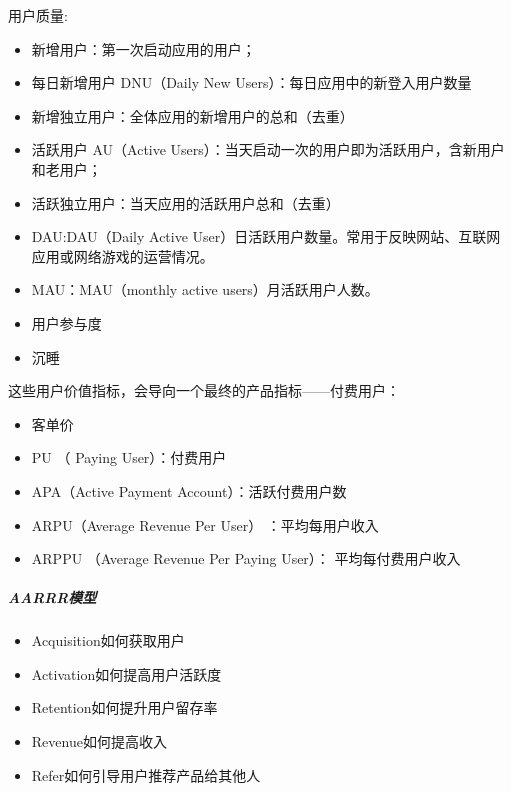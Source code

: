\documentclass[letterpaper,10pt,english]{sphinxmanual}
\begin{document}
用户质量:
\begin{itemize}
\item {} 
新增用户：第一次启动应用的用户；

\item {} 
每日新增用户 DNU（Daily New Users）：每日应用中的新登入用户数量

\item {} 
新增独立用户：全体应用的新增用户的总和（去重）

\item {} 
活跃用户 AU（Active
Users）：当天启动一次的用户即为活跃用户，含新用户和老用户；

\item {} 
活跃独立用户：当天应用的活跃用户总和（去重）

\item {} 
DAU:DAU（Daily Active
User）日活跃用户数量。常用于反映网站、互联网应用或网络游戏的运营情况。

\item {} 
MAU：MAU（monthly active users）月活跃用户人数。

\item {} 
用户参与度

\item {} 
沉睡

\end{itemize}

这些用户价值指标，会导向一个最终的产品指标——付费用户：
\begin{itemize}
\item {} 
客单价

\item {} 
PU （ Paying User）：付费用户

\item {} 
APA（Active Payment Account）：活跃付费用户数

\item {} 
ARPU（Average Revenue Per User） ：平均每用户收入

\item {} 
ARPPU （Average Revenue Per Paying User）： 平均每付费用户收入

\end{itemize}


\subparagraph{AARRR模型}
\label{\detokenize{chapter_knowledge/data_analysis:aarrr}}\begin{itemize}
\item {} 
Acquisition\sphinxhyphen{}如何获取用户

\item {} 
Activation\sphinxhyphen{}如何提高用户活跃度

\item {} 
Retention\sphinxhyphen{}如何提升用户留存率

\item {} 
Revenue\sphinxhyphen{}如何提高收入

\item {} 
Refer\sphinxhyphen{}如何引导用户推荐产品给其他人

\end{itemize}
\end{document}
